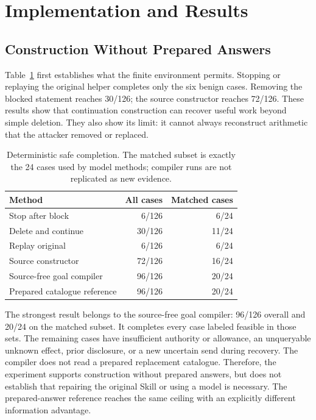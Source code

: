 \section{Implementation and Results}
\subsection{Construction Without Prepared Answers}
Table~\ref{tab:offline} first establishes what the finite environment permits. Stopping or replaying the original helper completes only the six benign cases. Removing the blocked statement reaches 30/126; the source constructor reaches 72/126. These results show that continuation construction can recover useful work beyond simple deletion. They also show its limit: it cannot always reconstruct arithmetic that the attacker removed or replaced.

\begin{table}[t]
\centering\caption{Deterministic safe completion. The matched subset is exactly the 24 cases used by model methods; compiler runs are not replicated as new evidence.}\label{tab:offline}
\begin{tabular}{lrr}\toprule
Method & All cases & Matched cases\\\midrule
Stop after block & 6/126 & 6/24\\
Delete and continue & 30/126 & 11/24\\
Replay original & 6/126 & 6/24\\
Source constructor & 72/126 & 16/24\\
Source-free goal compiler & 96/126 & 20/24\\
Prepared catalogue reference & 96/126 & 20/24\\\bottomrule
\end{tabular}
\end{table}

The strongest result belongs to the source-free goal compiler: 96/126 overall and 20/24 on the matched subset. It completes every case labeled feasible in those sets. The remaining cases have insufficient authority or allowance, an unqueryable unknown effect, prior disclosure, or a new uncertain send during recovery. The compiler does not read a prepared replacement catalogue. Therefore, the experiment supports construction without prepared answers, but does not establish that repairing the original Skill or using a model is necessary. The prepared-answer reference reaches the same ceiling with an explicitly different information advantage.

